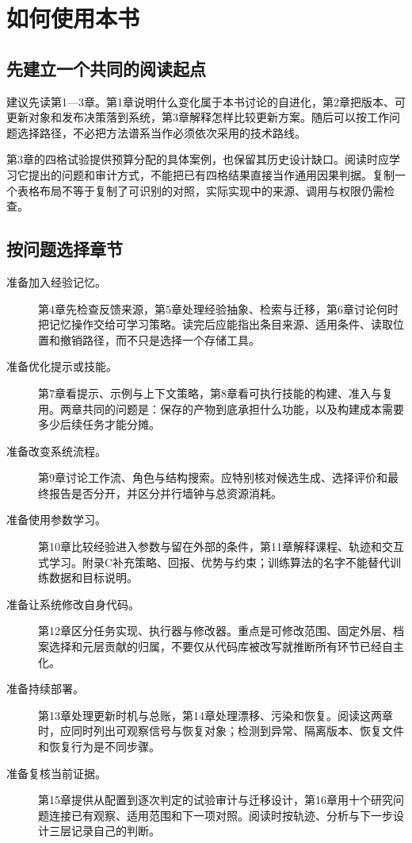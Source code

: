 \chapter{如何使用本书}

\section*{先建立一个共同的阅读起点}

建议先读第1—3章。第1章说明什么变化属于本书讨论的自进化，第2章把版本、可更新对象和发布决策落到系统，第3章解释怎样比较更新方案。随后可以按工作问题选择路径，不必把方法谱系当作必须依次采用的技术路线。

第3章的四格试验提供预算分配的具体案例，也保留其历史设计缺口。阅读时应学习它提出的问题和审计方式，不能把已有四格结果直接当作通用因果判据。复制一个表格布局不等于复制了可识别的对照，实际实现中的来源、调用与权限仍需检查。

\section*{按问题选择章节}

\begin{description}
 \item[准备加入经验记忆。] 第4章先检查反馈来源，第5章处理经验抽象、检索与迁移，第6章讨论何时把记忆操作交给可学习策略。读完后应能指出条目来源、适用条件、读取位置和撤销路径，而不只是选择一个存储工具。
 \item[准备优化提示或技能。] 第7章看提示、示例与上下文策略，第8章看可执行技能的构建、准入与复用。两章共同的问题是：保存的产物到底承担什么功能，以及构建成本需要多少后续任务才能分摊。
 \item[准备改变系统流程。] 第9章讨论工作流、角色与结构搜索。应特别核对候选生成、选择评价和最终报告是否分开，并区分并行墙钟与总资源消耗。
 \item[准备使用参数学习。] 第10章比较经验进入参数与留在外部的条件，第11章解释课程、轨迹和交互式学习。附录C补充策略、回报、优势与约束；训练算法的名字不能替代训练数据和目标说明。
 \item[准备让系统修改自身代码。] 第12章区分任务实现、执行器与修改器。重点是可修改范围、固定外层、档案选择和元层贡献的归属，不要仅从代码库被改写就推断所有环节已经自主化。
 \item[准备持续部署。] 第13章处理更新时机与总账，第14章处理漂移、污染和恢复。阅读这两章时，应同时列出可观察信号与恢复对象；检测到异常、隔离版本、恢复文件和恢复行为是不同步骤。
 \item[准备复核当前证据。] 第15章提供从配置到逐次判定的试验审计与迁移设计，第16章用十个研究问题连接已有观察、适用范围和下一项对照。阅读时按轨迹、分析与下一步设计三层记录自己的判断。
\end{description}


